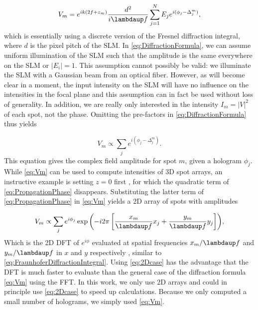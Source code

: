 \begin{equation}\label{eq:DiffractionFormula}
    V_m = e^{i k \left(2 f + z_m\right)}
    \frac{d^2}{i \lambdaup f} \sum_{j=1}^N E_j e^{i(\phi_j - \Delta_j^m)},
\end{equation}
which is essentially using a discrete version of the Fresnel diffraction integral, where $d$ is the pixel pitch of the SLM. 
In \cref{eq:DiffractionFormula}, we can assume uniform illumination of the SLM such that the amplitude is the same everywhere on the SLM or $|E_i| = 1$.
This assumption cannot possibly be valid: we illuminate the SLM with a Gaussian beam from an optical fiber.
However, as will become clear in a moment, the input intensity on the SLM will have no influence on the intensities in the focal plane and this assumption can in fact be used without loss of generality.
In addition, we are really only interested in the intensity $I_m =|V|^2$ of each spot, not the phase.
Omitting the pre-factors in \cref{eq:DiffractionFormula} thus yields

\begin{equation}\label{eq:Vm}
    V_m \propto \sum_{j} e^{i(\phi_j - \Delta_j^m)}.
\end{equation}
This equation gives the complex field amplitude for spot $m$, given a hologram $\phi_j$.
While \cref{eq:Vm} can be used to compute intensities of 3D spot arrays, an instructive example is setting $z=0$ first \cite{DiLeonardo2007}, for which the quadratic term of \cref{eq:PropagationPhase} disappears.
Substituting the latter term of \cref{eq:PropagationPhase} in \cref{eq:Vm} yields a 2D array of spots with amplitudes 

\begin{equation}\label{eq:2Dcase}
    V_m \propto \sum_j e^{i\phi_j} \exp{\left(
    - i 2\pi \left[
    \frac{x_m}{\lambdaup f} x_j + \frac{y_m}{\lambdaup f} y_j
    \right]
    \right)},
\end{equation}
Which is the 2D \ac{DFT} of $e^{i\phi}$ evaluated at spatial frequencies $x_m/\lambdaup f$ and $y_m/\lambdaup f$ in $x$ and $y$ respectively \cite{Bijnen2015,DiLeonardo2007}, similar to \cref{eq:FraunhoferDiffractionIntegral}.
Using \cref{eq:2Dcase} has the advantage that the DFT is much faster to evaluate than the general case of the diffraction formula \cref{eq:Vm} using the \ac{FFT}.
In this work, we only use 2D arrays and could in principle use \cref{eq:2Dcase} to speed up calculations.
Because we only computed a small number of holograms, we simply used \cref{eq:Vm}.

